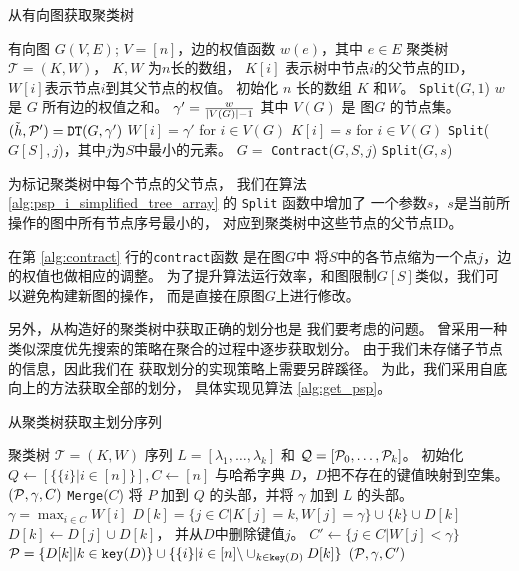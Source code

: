 \begin{algorithm}[!ht]
	\caption{从有向图获取聚类树}\label{alg:psp_i_simplified_tree_array}
	\begin{algorithmic}[1]
		\REQUIRE 有向图 $G(V, E)$; $V=[n]$，边的权值函数 $w(e)$，其中 $e\in E$
		\ENSURE 聚类树 $\mathcal{T}=(K, W)$， $K,W$ 为$n$长的数组，
    $K[i]$ 表示树中节点$i$的父节点的ID，
    $W[i]$表示节点$i$到其父节点的权值。
		\STATE 初始化 $n$ 长的数组 $K$
     和$W$。
		\STATE \texttt{Split}($G, 1$)
		\STATE $w$ 是 $G$ 所有边的权值之和。
		\STATE $\gamma' = \frac{w}{\abs{V(G)}-1}$
    其中 $V(G)$ 是 图$G$
    的节点集。
		\STATE $(\tilde{h}, \P')
    = \texttt{DT}(G, \gamma')$ 
		\STATE $W[i]=\gamma'$ for $ i \in V(G)$
    \STATE $K[i]=s$ for $i\in V(G)$
    \ELSE
		\STATE \texttt{Split}($G[S], j$)，其中$j$为$S$中最小的元素。
		\STATE $G=$ \texttt{Contract}($G, S, j$) \label{alg:contract}
    \ENDFOR 
		\STATE \texttt{Split}($G, s$)
		\ENDIF
		\ENDFUNCTION
	\end{algorithmic}
\end{algorithm}

为标记聚类树中每个节点的父节点，
我们在算法 \ref{alg:psp_i_simplified_tree_array} 的 \texttt{Split} 函数中增加了
一个参数$s$，$s$是当前所操作的图中所有节点序号最小的，
对应到聚类树中这些节点的父节点ID。

在第 \ref{alg:contract} 行的\texttt{contract}函数 是在图$G$中
将$S$中的各节点缩为一个点$j$，边的权值也做相应的调整。
为了提升算法运行效率，和图限制$G[S]$类似，我们可以避免构建新图的操作，
而是直接在原图$G$上进行修改。

另外，从构造好的聚类树中获取正确的划分也是
我们要考虑的问题。
\citet{chan2020agglomerative}曾采用一种
类似深度优先搜索的策略在聚合的过程中逐步获取划分。
由于我们未存储子节点的信息，因此我们在
获取划分的实现策略上需要另辟蹊径。
为此，我们采用自底向上的方法获取全部的划分，
具体实现见算法 \ref{alg:get_psp}。

\begin{algorithm}[!ht]
	\caption{从聚类树获取主划分序列}\label{alg:get_psp}
	\begin{algorithmic}[1]
		\REQUIRE 聚类树 $\mathcal{T}=(K, W)$
		\ENSURE 序列 $L=[\lambda_1, \dots, \lambda_k]$
    和 $\mathcal{Q}=[\P_0, \dots, \P_k]$。
    \STATE 初始化 $Q\leftarrow [ \{\{i\}|i\in [n]\} ], C\leftarrow [n]$
    与哈希字典 $D$，$D$把不存在的键值映射到空集。
		\STATE $(\P,\gamma, C)$ \leftarrow \texttt{Merge}($C$)
    \STATE 将 $P$ 加到 $Q$ 的头部，并将 $\gamma$ 加到 $L$ 的头部。
    \ENDWHILE
    \STATE $\gamma = \max_{i\in C} W[i]$
    \STATE $D[k] = \{ j\in C | K[j] = k, W[j]=\gamma\} \cup \{k\} \cup D[k]$
    \STATE $D[k] \leftarrow D[j] \cup D[k]$， 并从$D$中删除键值$j$。
    \ENDFOR
    \STATE $C' \leftarrow  \{j\in C | W[j]<\gamma\}$
    \STATE $\P=\{D[k] | k \in \texttt{key}(D)\} \cup \{\{i\} | i \in [n]\backslash \cup_{k \in \texttt{key}(D)} D[k] \}$
    \RETURN $(\P, \gamma, C')$
		\ENDFUNCTION
	\end{algorithmic}
\end{algorithm}

